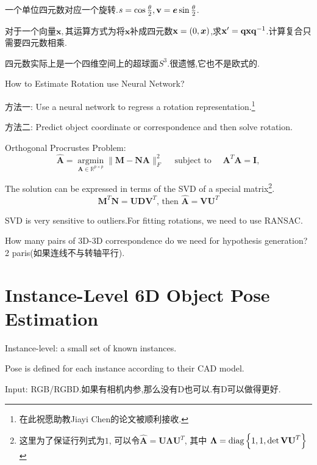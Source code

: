 	一个单位四元数对应一个旋转.$s = \cos \frac{\theta}{2}, \bold{v} = \boldsymbol e \sin \frac{\theta}{2}$.
	
	对于一个向量$\bm x, $其运算方式为将$\bm x$补成四元数$\bold{x} = (0, \boldsymbol x)$,求$\bold{x}^\prime = \bold{q} \bold{x} \bold{q}^{-1}$.计算复合只需要四元数相乘.
	
	四元数实际上是一个四维空间上的超球面$S^3$.很遗憾,它也不是欧式的.
	
	How to Estimate Rotation use Neural Network?
	
	方法一: Use a neural network to regress a rotation representation.\footnote{在此祝愿助教Jiayi Chen的论文被顺利接收.}
	
	方法二: Predict object coordinate or correspondence and then solve 
	rotation.
	
	Orthogonal Procrustes Problem:
	\begin{equation}
		\widehat{\mathbf{A}}=\underset{\mathbf{A} \in \mathbb{R}^{p \times p}}{\operatorname{argmin}}\|\mathbf{M}-\mathbf{N A}\|_{F}^{2} \quad \text { subject to } \quad \mathbf{A}^{T} \mathbf{A}=\mathbf{I},
	\end{equation}
	
	The solution can be expressed in terms of the SVD of a special matrix\footnote{这里为了保证行列式为$1$, 可以令$\widehat{\mathbf{A}}=\mathbf{U} \mathbf{\Lambda} \mathbf{U}^{T}$, 其中 $\mathbf{\Lambda} = \textup{diag}\left\{ 1, 1, \det \mathbf{V U}^{T}\right\}$}.
	\begin{equation}
		\mathbf{M}^{T} \mathbf{N}=\mathbf{U D V}^{T} \text {, then } \widehat{\mathbf{A}}=\mathbf{V U}^{T}
	\end{equation}
	
	SVD is very sensitive to outliers.For fitting rotations, we need to use RANSAC.
	
	How many pairs of 3D-3D correspondence do we need for 
	hypothesis generation? 2 paris(如果连线不与转轴平行).
	
	\section{Instance-Level 6D Object Pose Estimation}
	 Instance-level: a small set of known instances.
	 
	 Pose is defined for each instance according to their CAD model.
	 
	 Input: RGB/RGBD.如果有相机内参,那么没有D也可以.有D可以做得更好.
	 
